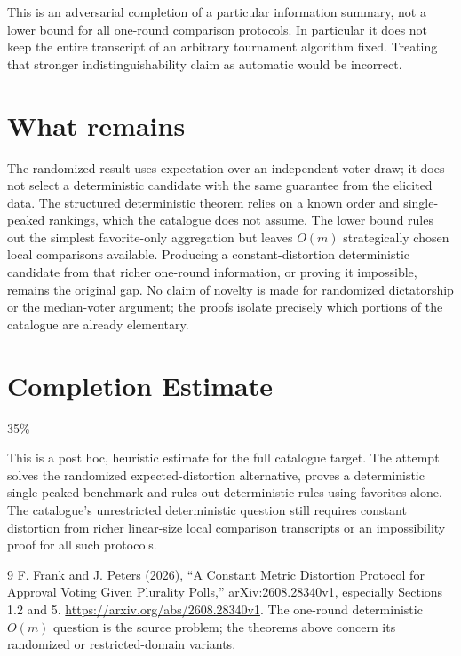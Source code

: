 \documentclass[11pt,a4paper]{article}
\theoremstyle{definition}
\theoremstyle{remark}
\begin{document}
This is an adversarial completion of a particular information summary, not a lower bound for all one-round comparison protocols. In particular it does not keep the entire transcript of an arbitrary tournament algorithm fixed. Treating that stronger indistinguishability claim as automatic would be incorrect.

\section{What remains}
The randomized result uses expectation over an independent voter draw; it does not select a deterministic candidate with the same guarantee from the elicited data. The structured deterministic theorem relies on a known order and single-peaked rankings, which the catalogue does not assume. The lower bound rules out the simplest favorite-only aggregation but leaves $O(m)$ strategically chosen local comparisons available. Producing a constant-distortion deterministic candidate from that richer one-round information, or proving it impossible, remains the original gap. No claim of novelty is made for randomized dictatorship or the median-voter argument; the proofs isolate precisely which portions of the catalogue are already elementary.

\section{Completion Estimate}
35\%

This is a post hoc, heuristic estimate for the full catalogue target.
The attempt solves the randomized expected-distortion alternative, proves a deterministic single-peaked benchmark and rules out deterministic rules using favorites alone. The catalogue's unrestricted deterministic question still requires constant distortion from richer linear-size local comparison transcripts or an impossibility proof for all such protocols.

\begin{thebibliography}{9}
 F. Frank and J. Peters (2026), ``A Constant Metric Distortion Protocol for Approval Voting Given Plurality Polls,'' arXiv:2608.28340v1, especially Sections 1.2 and 5. \url{https://arxiv.org/abs/2608.28340v1}. The one-round deterministic $O(m)$ question is the source problem; the theorems above concern its randomized or restricted-domain variants.
\end{thebibliography}
\end{document}
